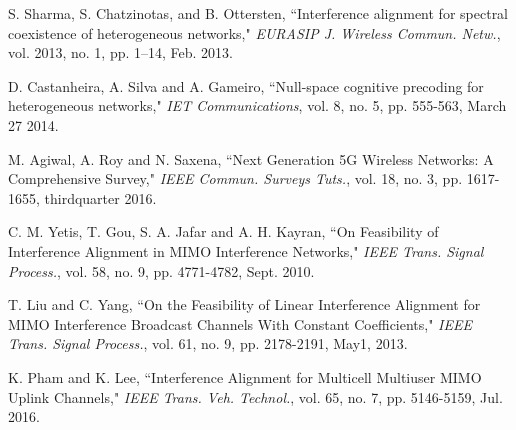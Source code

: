 \documentclass[journal]{IEEEtran}
\begin{document}
\begin{thebibliography}{1}
S. Sharma, S. Chatzinotas, and B. Ottersten, ``Interference alignment for spectral coexistence of heterogeneous networks," \textit{EURASIP J. Wireless Commun. Netw.}, vol. 2013, no. 1, pp. 1–14, Feb. 2013.

D. Castanheira, A. Silva and A. Gameiro, ``Null-space cognitive precoding for heterogeneous networks," \textit{IET Communications}, vol. 8, no. 5, pp. 555-563, March 27 2014.

M. Agiwal, A. Roy and N. Saxena, ``Next Generation 5G Wireless Networks: A Comprehensive Survey," \textit{IEEE Commun. Surveys Tuts.}, vol. 18, no. 3, pp. 1617-1655, thirdquarter 2016.


C. M. Yetis, T. Gou, S. A. Jafar and A. H. Kayran, ``On Feasibility of Interference Alignment in MIMO Interference Networks," \textit{IEEE Trans. Signal Process.}, vol. 58, no. 9, pp. 4771-4782, Sept. 2010.

T. Liu and C. Yang, ``On the Feasibility of Linear Interference Alignment for MIMO Interference Broadcast Channels With Constant Coefficients," \textit{IEEE Trans. Signal Process.}, vol. 61, no. 9, pp. 2178-2191, May1, 2013.

K. Pham and K. Lee, ``Interference Alignment for Multicell Multiuser MIMO Uplink Channels," \textit{IEEE Trans. Veh. Technol.}, vol. 65, no. 7, pp. 5146-5159, Jul. 2016. 


\end{thebibliography}

% 








\end{document}

